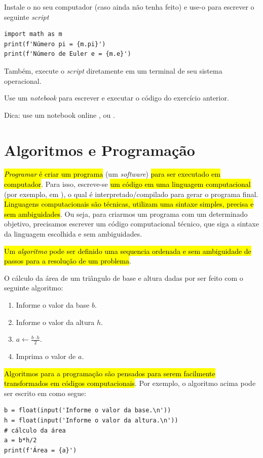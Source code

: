 \begin{exer}
  Instale o {\spyder} no seu computador (caso ainda não tenha feito) e use-o para escrever o seguinte {\it script}
\begin{lstlisting}
import math as m
print(f'Número pi = {m.pi}')
print(f'Número de Euler e = {m.e}')
\end{lstlisting}
  Também, execute o {\it script} diretamente em um terminal de seu sistema operacional.
\end{exer}

\begin{exer}
  Use um {\it notebook} {\python} para escrever e executar o código do exercício anterior.
\end{exer}
\begin{resp}
  Dica: use um notebook online {\colab}, {\kaggle} ou {\jupyter}.
\end{resp}

\section{Algoritmos e Programação}\label{cap_lingua_sec_algoprog}

\hl{\emph{Programar} é criar um programa} (um {\it software}) \hl{para ser executado em computador}. Para isso, escreve-se \hl{um código em uma linguagem computacional} (por exemplo, em {\python}), o qual é interpretado/compilado para gerar o programa final. \hl{Linguagens computacionais são técnicas, utilizam uma sintaxe simples, precisa e sem ambiguidades}. Ou seja, para criarmos um programa com um determinado objetivo, precisamos escrever um código computacional técnico, que siga a sintaxe da linguagem escolhida e sem ambiguidades.

\hl{Um \emph{algoritmo} pode ser definido uma sequencia ordenada e sem ambiguidade de passos para a resolução de um problema}.

\begin{ex}\label{cap_lingua_sec_algoprog:ex:areaTriang}
O cálculo da área de um triângulo de base e altura dadas por ser feito com o seguinte algoritmo:
\begin{enumerate}
\item Informe o valor da base $b$.
\item Informe o valor da altura $h$.
\item $\displaystyle a \leftarrow \frac{b\cdot h}{2}$.
\item Imprima o valor de $a$.
\end{enumerate}

\hl{Algoritmos para a programação são pensados para serem facilmente transformados em códigos computacionais}. Por exemplo, o algoritmo acima pode ser escrito em {\python} como segue:
\begin{lstlisting}
b = float(input('Informe o valor da base.\n'))
h = float(input('Informe o valor da altura.\n'))
# cálculo da área
a = b*h/2
print(f'Área = {a}')
\end{lstlisting}
\end{ex}

